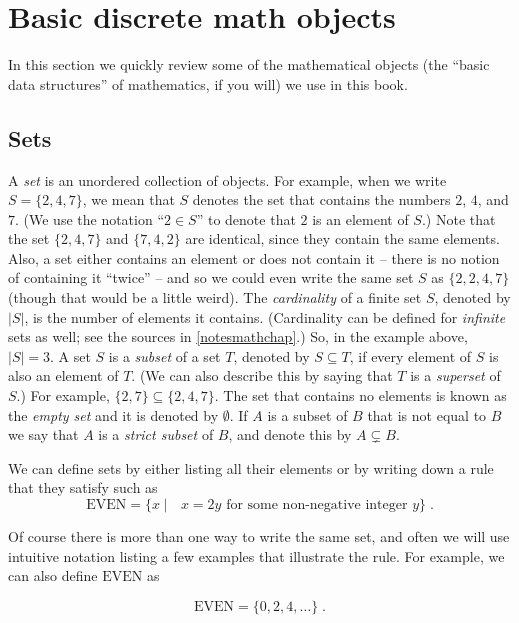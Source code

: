 \section{Basic discrete math objects}\label{Basic-discrete-math-objec}

In this section we quickly review some of the mathematical objects (the
``basic data structures'' of mathematics, if you will) we use in this
book.

\subsection{Sets}\label{Sets}

A \emph{set} is an unordered collection of objects. For example, when we
write \(S = \{ 2,4, 7 \}\), we mean that \(S\) denotes the set that
contains the numbers \(2\), \(4\), and \(7\). (We use the notation
``\(2 \in S\)'' to denote that \(2\) is an element of \(S\).) Note that
the set \(\{ 2, 4, 7 \}\) and \(\{ 7 , 4, 2 \}\) are identical, since
they contain the same elements. Also, a set either contains an element
or does not contain it -- there is no notion of containing it ``twice''
-- and so we could even write the same set \(S\) as \(\{ 2, 2, 4, 7\}\)
(though that would be a little weird). The \emph{cardinality} of a
finite set \(S\), denoted by \(|S|\), is the number of elements it
contains. (Cardinality can be defined for \emph{infinite} sets as well;
see the sources in \cref{notesmathchap}.) So, in the example above,
\(|S|=3\). A set \(S\) is a \emph{subset} of a set \(T\), denoted by
\(S \subseteq T\), if every element of \(S\) is also an element of
\(T\). (We can also describe this by saying that \(T\) is a
\emph{superset} of \(S\).) For example,
\(\{2,7\} \subseteq \{ 2,4,7\}\). The set that contains no elements is
known as the \emph{empty set} and it is denoted by \(\emptyset\). If
\(A\) is a subset of \(B\) that is not equal to \(B\) we say that \(A\)
is a \emph{strict subset} of \(B\), and denote this by
\(A \subsetneq B\).

We can define sets by either listing all their elements or by writing
down a rule that they satisfy such as \[
\text{EVEN} = \{ x  \;|\; \text{ $x=2y$ for some non-negative integer $y$} \} \;.
\]

Of course there is more than one way to write the same set, and often we
will use intuitive notation listing a few examples that illustrate the
rule. For example, we can also define \(\text{EVEN}\) as

\[
\text{EVEN} = \{ 0,2,4, \ldots \} \;.
\]

